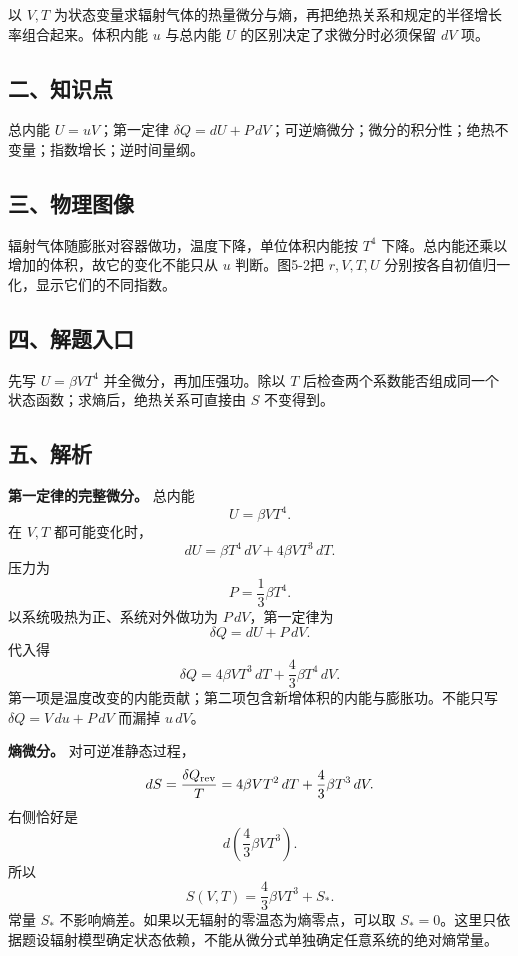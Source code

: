 \documentclass[12pt,a4paper,UTF8]{ctexart}
\begin{document}
以 \(V,T\)
为状态变量求辐射气体的热量微分与熵，再把绝热关系和规定的半径增长率组合起来。体积内能
\(u\) 与总内能 \(U\) 的区别决定了求微分时必须保留 \(dV\) 项。

\subsection{二、知识点}\label{ux4e8cux77e5ux8bc6ux70b9-4}

总内能 \(U=uV\)；第一定律
\(\delta Q=dU+P\,dV\)；可逆熵微分；微分的积分性；绝热不变量；指数增长；逆时间量纲。

\subsection{三、物理图像}\label{ux4e09ux7269ux7406ux56feux50cf-4}

辐射气体随膨胀对容器做功，温度下降，单位体积内能按 \(T^4\)
下降。总内能还乘以增加的体积，故它的变化不能只从 \(u\) 判断。图5-2把
\(r,V,T,U\) 分别按各自初值归一化，显示它们的不同指数。

\subsection{四、解题入口}\label{ux56dbux89e3ux9898ux5165ux53e3-4}

先写 \(U=\beta VT^4\) 并全微分，再加压强功。除以 \(T\)
后检查两个系数能否组成同一个状态函数；求熵后，绝热关系可直接由 \(S\)
不变得到。

\subsection{五、解析}\label{ux4e94ux89e3ux6790-4}

\textbf{第一定律的完整微分。} 总内能 \[
U=\beta VT^4.
\] 在 \(V,T\) 都可能变化时， \[
dU=\beta T^4\,dV+4\beta VT^3\,dT.
\] 压力为 \[
P=\frac13\beta T^4.
\] 以系统吸热为正、系统对外做功为 \(P\,dV\)，第一定律为 \[
\delta Q=dU+P\,dV.
\] 代入得 \[
\boxed{\delta Q=4\beta VT^3\,dT+\frac43\beta T^4\,dV}.
\]
第一项是温度改变的内能贡献；第二项包含新增体积的内能与膨胀功。不能只写
\(\delta Q=V\,du+P\,dV\) 而漏掉 \(u\,dV\)。

\textbf{熵微分。} 对可逆准静态过程， \[
dS=\frac{\delta Q_{\rm rev}}T
=4\beta VT^2\,dT+\frac43\beta T^3\,dV.
\] 右侧恰好是 \[
d\left(\frac43\beta VT^3\right).
\] 所以 \[
\boxed{S(V,T)=\frac43\beta VT^3+S_*}.
\] 常量 \(S_*\) 不影响熵差。如果以无辐射的零温态为熵零点，可以取
\(S_*=0\)。这里只依据题设辐射模型确定状态依赖，不能从微分式单独确定任意系统的绝对熵常量。
\end{document}
